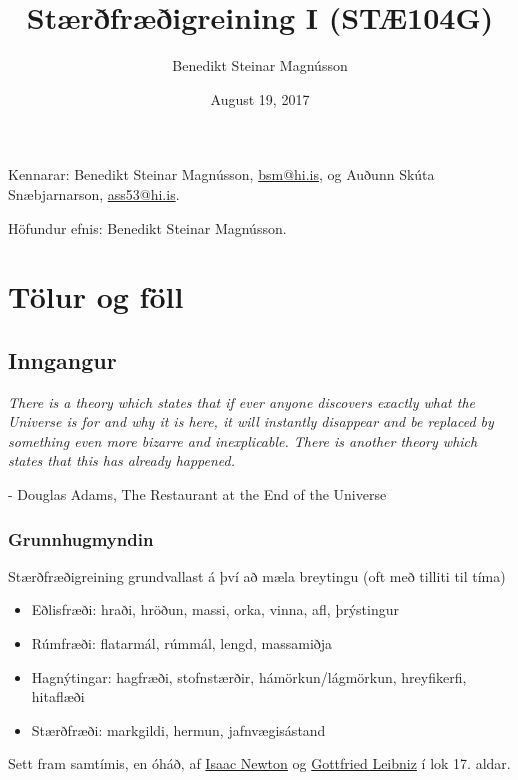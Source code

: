\documentclass[a4paper,10pt,icelandic]{sphinxmanual}
\title{Stærðfræðigreining I (STÆ104G)}
\date{August 19, 2017}
\author{Benedikt Steinar Magnússon}
\begin{document}
\maketitle
\tableofcontents
{}\label{index::doc}


Kennarar: Benedikt Steinar Magnússon, \href{mailto:bsm@hi.is}{bsm@hi.is}, og
Auðunn Skúta Snæbjarnarson, \href{mailto:ass53@hi.is}{ass53@hi.is}.

Höfundur efnis: Benedikt Steinar Magnússon.


\chapter{Tölur og föll}
\label{kafli01::doc}\label{kafli01:tolur-og-foll}\label{kafli01:staerfraeigreining-i-stae104g-haskoli-islands-haust-2017}

\section{Inngangur}
\label{kafli01:inngangur}
\emph{There is a theory which states that if ever anyone discovers exactly what the Universe is for and why it is here, it will instantly disappear and be replaced by something even more bizarre and inexplicable.
There is another theory which states that this has already happened.}

- Douglas Adams, The Restaurant at the End of the Universe


\subsection{Grunnhugmyndin}
\label{kafli01:grunnhugmyndin}
Stærðfræðigreining grundvallast á því að mæla breytingu (oft með tilliti
til tíma)
\begin{itemize}
\item {} 
Eðlisfræði: hraði, hröðun, massi, orka, vinna, afl, þrýstingur

\item {} 
Rúmfræði: flatarmál, rúmmál, lengd, massamiðja

\item {} 
Hagnýtingar: hagfræði, stofnstærðir, hámörkun/lágmörkun, hreyfikerfi, hitaflæði

\item {} 
Stærðfræði: markgildi, hermun, jafnvægisástand

\end{itemize}

Sett fram samtímis, en óháð, af
\href{http://www.visindavefur.is/svar.php?id=1635}{Isaac Newton} og
\href{http://www.visindavefur.is/svar.php?id=59920}{Gottfried Leibniz} í lok 17. aldar.
\end{document}
